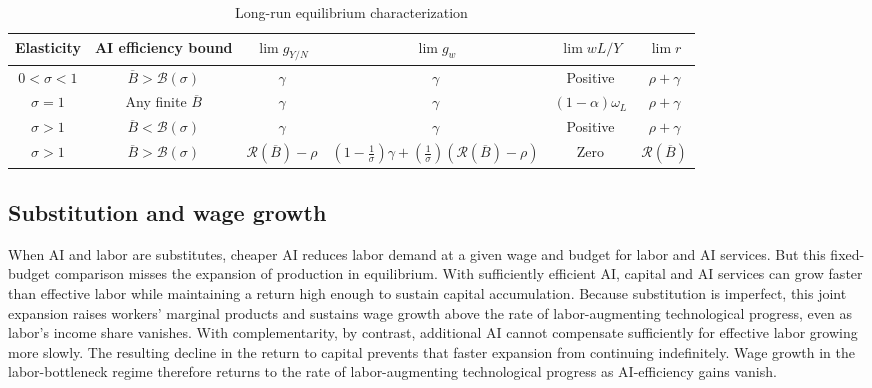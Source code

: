 \begin{table}[H]
\centering
\caption{Long-run equilibrium characterization}
\label{tab:rewrite-finite-existence}
\small
\begin{tabular}{@{}c|c|c|c|c|c@{}}
\toprule
Elasticity & AI efficiency bound & $\lim g_{Y/N}$ & $\lim g_w$ & $\lim wL/Y$ & $\lim r$ \\
\midrule
$0<\sigma<1$ & $\overline B>\mathcal B(\sigma)$ & $\gamma$ & $\gamma$ & Positive & $\rho+\gamma$ \\
$\sigma=1$ & Any finite $\overline B$ & $\gamma$ & $\gamma$ & $(1-\alpha)\omega_L$ & $\rho+\gamma$ \\
$\sigma>1$ & $\overline B<\mathcal B(\sigma)$ & $\gamma$ & $\gamma$ & Positive & $\rho+\gamma$ \\
$\sigma>1$ & $\overline B>\mathcal B(\sigma)$ & $\mathcal R(\overline B) -\rho$ & $\left(1-\frac{1}{\sigma}\right)\gamma+\left(\frac{1}{\sigma}\right)\left(\mathcal R(\overline B)-\rho\right)$ & Zero & $\mathcal R(\overline B)$ \\
\bottomrule
\end{tabular}
\end{table}






\subsection{Substitution and wage growth}
\label{subsec:rewrite-substitution-wage-growth}

When AI and labor are substitutes, cheaper AI reduces labor demand at a given wage and budget for labor and AI services. But this fixed-budget comparison misses the expansion of production in equilibrium. With sufficiently efficient AI, capital and AI services can grow faster than effective labor while maintaining a return high enough to sustain capital accumulation. Because substitution is imperfect, this joint expansion raises workers' marginal products and sustains wage growth above the rate of labor-augmenting technological progress, even as labor's income share vanishes. With complementarity, by contrast, additional AI cannot compensate sufficiently for effective labor growing more slowly. The resulting decline in the return to capital prevents that faster expansion from continuing indefinitely. Wage growth in the labor-bottleneck regime therefore returns to the rate of labor-augmenting technological progress as AI-efficiency gains vanish.

